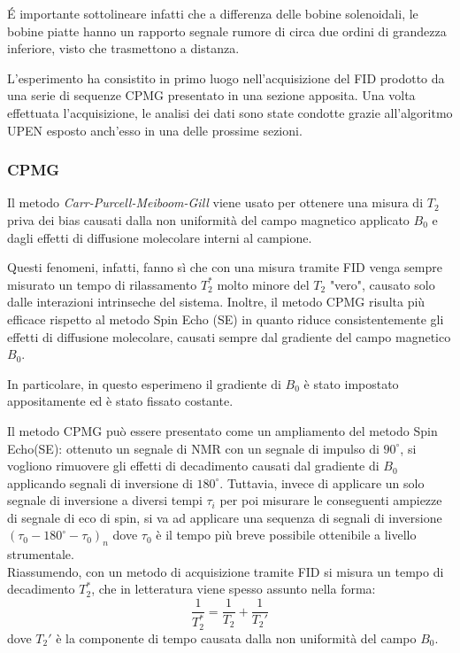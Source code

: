\'E importante sottolineare infatti che a differenza delle bobine solenoidali, le bobine piatte hanno un rapporto segnale rumore di circa due ordini di grandezza inferiore, visto che trasmettono a distanza.

L'esperimento ha consistito in primo luogo nell'acquisizione del FID prodotto da una serie di sequenze CPMG presentato in una sezione apposita.
Una volta effettuata l'acquisizione, le analisi dei dati sono state condotte grazie all'algoritmo UPEN esposto anch'esso in una delle prossime sezioni.

\subsubsection*{CPMG}
Il metodo \textit{Carr-Purcell-Meiboom-Gill} viene usato per ottenere una misura di $T_2$ priva dei bias causati dalla non uniformità del campo magnetico applicato $B_0$ e dagli effetti di diffusione molecolare interni al campione.

Questi fenomeni, infatti, fanno sì che con una misura tramite FID venga sempre misurato un tempo di rilassamento $T_2^*$ molto minore del $T_2$ "vero", causato solo dalle interazioni intrinseche del sistema. Inoltre, il metodo CPMG risulta più efficace rispetto al metodo Spin Echo (SE) in quanto riduce consistentemente gli effetti di diffusione molecolare, causati sempre dal gradiente del campo magnetico $B_0$.

In particolare, in questo esperimeno il gradiente di $B_0$ è stato impostato appositamente ed è stato fissato costante.

Il metodo CPMG può essere presentato come un ampliamento del metodo Spin Echo(SE): ottenuto un segnale di NMR con un segnale di impulso di $90^\circ$, si vogliono rimuovere gli effetti di decadimento causati dal gradiente di $B_0$ applicando segnali di inversione di $180^\circ$. Tuttavia, invece di applicare un solo segnale di inversione a diversi tempi $\tau_i$ per poi misurare le conseguenti ampiezze di segnale di eco di spin, si va ad applicare una sequenza di segnali di inversione $(\tau_0 - 180^\circ - \tau_0)_n$ dove $\tau_0$ è il tempo più breve possibile ottenibile a livello strumentale.\\

Riassumendo, con un metodo di acquisizione tramite FID si misura un tempo di decadimento $T_2^*$, che in letteratura viene spesso assunto nella forma:
\begin{equation}
	\frac{1}{T_2^*} = \frac{1}{T_2} +\frac{1}{T_2'}
\end{equation}
dove $T_2'$ è la componente di tempo causata dalla non uniformità del campo $B_0$.

